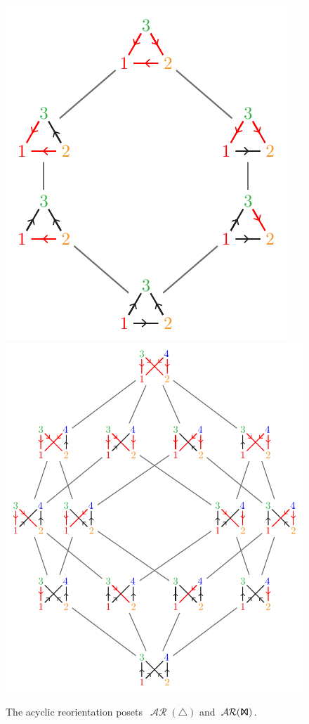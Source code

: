 \documentclass{amsart}
\theoremstyle{definition}
\renewcommand{\c}[1]{\mathcal{#1}} %
\DeclareMathOperator{\AReori}{\c{AR}}  %
\newcommand{\Tgraph}{\sf I\!X\!I} %
\newcommand{\Kgraph}{\boldsymbol{\triangle}} %
\begin{document}
\begin{figure}
	\centerline{\includegraphics[scale=.68,valign=c]{acyclicReorientationsK}\qquad\includegraphics[scale=.68,valign=c]{acyclicReorientationsT}}
	\caption{The acyclic reorientation posets~$\AReori(\Kgraph)$ and~$\AReori(\Tgraph)$.}
	\label{fig:acyclicReorientationsKT}
\end{figure}
\end{document}
